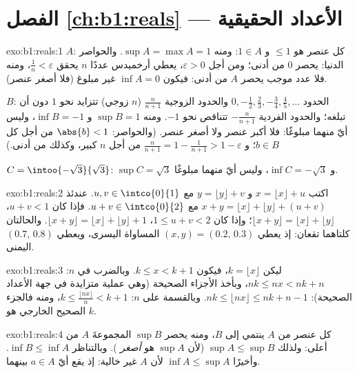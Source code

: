 \section*{الفصل \ref{ch:b1:reals} --- الأعداد الحقيقية}

\begin{solution}{exo:b1:reals:1}
$A$: كل عنصر هو $\leq 1$ و $1 \in A$: ومنه $\sup A = \max A = 1$.
والحواصر الدنيا: يحصر $0$ من أدنى؛ ومن أجل $\varepsilon > 0$، يعطي أرخميدس
عددًا $n$ يحقق $\frac 1n < \varepsilon$، ومنه فلا عدد موجب
يحصر $A$ من أدنى: فيكون $\inf A = 0$ غير مبلوغ (فلا أصغر عنصر).

$B$: الحدود $0, -\frac12, \frac23, -\frac34, \frac45, \dots$ والحدود
الزوجية $\frac{n}{n+1}$ ($n$ زوجي) تتزايد نحو $1$ دون أن تبلغه؛
والحدود الفردية $-\frac{n}{n+1}$ تتناقص نحو $-1$. ومنه $\sup B = 1$ و
$\inf B = -1$، وليس أيّ منهما مبلوغًا: فلا أكبر عنصر ولا أصغر عنصر. (والحواصر: $\abs{b}
< 1$ من أجل كل $b \in B$؛ و $\frac{n}{n+1} = 1 - \frac{1}{n+1} > 1 -
\varepsilon$ من أجل $n$ كبير، وكذلك من أدنى.)

$C = \intoo{-\sqrt 3}{\sqrt 3}$: $\sup C = \sqrt 3$ و $\inf C =
-\sqrt 3$، وليس أيّ منهما مبلوغًا.
\end{solution}

\begin{solution}{exo:b1:reals:2}
اكتب $x = \lfloor x \rfloor + u$ و $y = \lfloor y \rfloor + v$ مع
$u, v \in \intco{0}{1}$. عندئذ $x + y = \lfloor x \rfloor + \lfloor y
\rfloor + (u + v)$ مع $u + v \in \intco{0}{2}$. فإذا كان $u + v < 1$،
$\lfloor x + y\rfloor = \lfloor x\rfloor + \lfloor y \rfloor$؛ وإذا كان
$1 \leq u + v < 2$، $\lfloor x+y \rfloor = \lfloor x \rfloor +
\lfloor y \rfloor + 1$. والحالتان كلتاهما تقعان: إذ يعطي $(x, y) = (0.2,\, 0.3)$
المساواة اليسرى، ويعطي $(0.7,\, 0.8)$ اليمنى.
\end{solution}

\begin{solution}{exo:b1:reals:3}
ليكن $k = \lfloor x \rfloor$، فيكون $k \leq x < k + 1$. وبالضرب في
$n$: $nk \leq nx < nk + n$، وبأخذ الأجزاء الصحيحة (وهي عملية متزايدة
في جهة الأعداد الصحيحة): $nk \leq \lfloor nx \rfloor \leq nk + n
- 1$. وبالقسمة على $n$: $k \leq \frac{\lfloor nx \rfloor}{n} < k + 1$،
ومنه فالجزء الصحيح الخارجي هو $k$.
\end{solution}

\begin{solution}{exo:b1:reals:4}
كل عنصر من $A$ ينتمي إلى $B$، ومنه يحصر $\sup B$ المجموعةَ $A$ من أعلى:
ولذلك $\sup A \leq \sup B$ (لأن $\sup A$ هو \emph{أصغر} ). وبالتناظر $\inf B \leq \inf A$. وأخيرًا $\inf A \leq
\sup A$ لأن $A$ غير خالية: إذ يقع أيّ $a \in A$ بينهما.
\end{solution}

